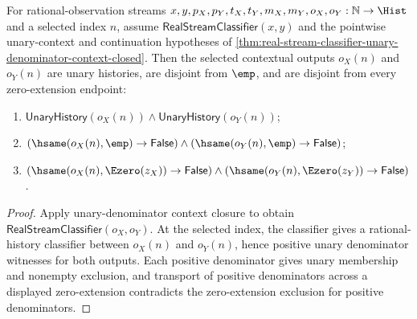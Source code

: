 \begin{theorem}
\label{thm:real-stream-classifier-unary-denominator-context-selected-shape-package}
For rational-observation streams
$x,y,p_X,p_Y,t_X,t_Y,m_X,m_Y,o_X,o_Y:\mathbb{N}\to\Hist$ and a selected
index $n$, assume $\mathsf{RealStreamClassifier}(x,y)$ and the pointwise
unary-context and continuation hypotheses of
\autoref{thm:real-stream-classifier-unary-denominator-context-closed}. Then
the selected contextual outputs $o_X(n)$ and $o_Y(n)$ are unary histories,
are disjoint from $\emp$, and are disjoint from every zero-extension endpoint:
\begin{enumerate}
\item $\mathsf{UnaryHistory}(o_X(n))\land \mathsf{UnaryHistory}(o_Y(n))$;
\item $(\hsame(o_X(n),\emp)\to\mathsf{False})\land
(\hsame(o_Y(n),\emp)\to\mathsf{False})$;
\item $(\hsame(o_X(n),\Ezero(z_X))\to\mathsf{False})\land
(\hsame(o_Y(n),\Ezero(z_Y))\to\mathsf{False})$.
\end{enumerate}
\end{theorem}
\begin{proof}
Apply unary-denominator context closure to obtain
$\mathsf{RealStreamClassifier}(o_X,o_Y)$. At the selected index, the classifier
gives a rational-history classifier between $o_X(n)$ and $o_Y(n)$, hence
positive unary denominator witnesses for both outputs. Each positive
denominator gives unary membership and nonempty exclusion, and transport of
positive denominators across a displayed zero-extension contradicts the
zero-extension exclusion for positive denominators.
\end{proof}

